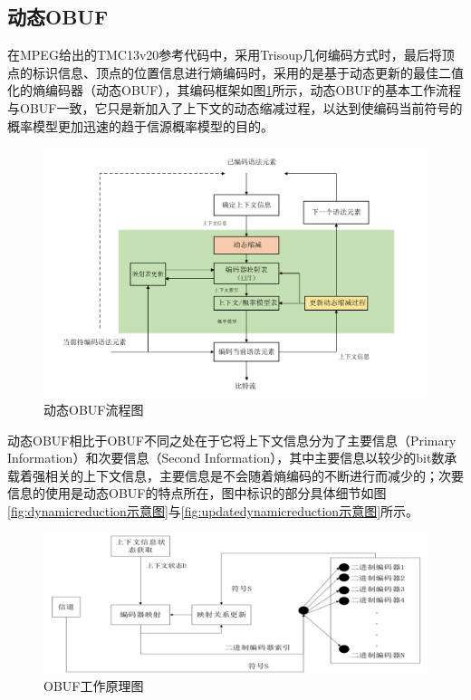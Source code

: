 \documentclass[bachelor,print,msfonts]{xduthesis}
\begin{document}
\subsection{动态OBUF}
\label{动态OBUF}
在MPEG给出的TMC13v20参考代码中，采用Trisoup几何编码方式时，最后将顶点的标识信息、顶点的位置信息进行熵编码时，采用的是基于动态更新的最佳二值化的熵编码器（动态OBUF），其编码框架如图\ref{fig:动态OBUF流程图}所示，动态OBUF的基本工作流程与OBUF一致，它只是新加入了上下文的动态缩减过程，以达到使编码当前符号的概率模型更加迅速的趋于信源概率模型的目的。
\begin{figure}[h]
    \centering
    \includegraphics[scale=0.4]{image/动态OBUF流程图ykv2.pdf}
    \caption{动态OBUF流程图}
    \label{fig:动态OBUF流程图}
\end{figure}

动态OBUF相比于OBUF不同之处在于它将上下文信息分为了主要信息（Primary Information）和次要信息（Second Information），其中主要信息以较少的bit数承载着强相关的上下文信息，主要信息是不会随着熵编码的不断进行而减少的；次要信息的使用是动态OBUF的特点所在，图中标识的部分具体细节如图\ref{fig:dynamicreduction示意图}与\ref{fig:updatedynamicreduction示意图}所示。
\begin{figure}[h]
    \centering
    \includegraphics[scale=0.5]{image/OBUF工作原理图.png}
    \caption{OBUF工作原理图}
\end{figure}
\end{document}
